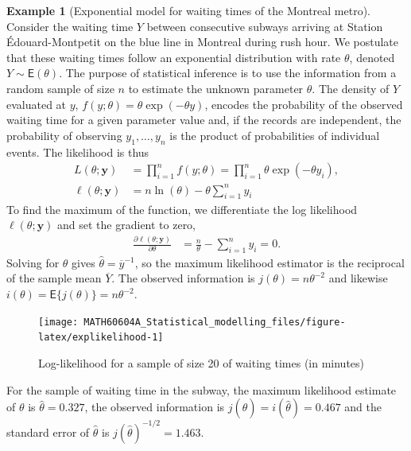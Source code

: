 \documentclass[
  11pt,
  letterpaper,
]{book}
\theoremstyle{definition}
\theoremstyle{definition}
\newtheorem{example}{Example}[chapter]
\theoremstyle{definition}
\theoremstyle{definition}
\theoremstyle{remark}
\begin{document}
\begin{example}[Exponential model for waiting times of the Montreal metro]
\protect\hypertarget{exm:waitingtime}{}\label{exm:waitingtime}Consider the waiting time \(Y\) between consecutive subways arriving at Station Édouard-Montpetit on the blue line in Montreal during rush hour. We postulate that these waiting times follow an exponential distribution with rate \(\theta\), denoted \(Y \sim \mathsf{E}(\theta)\). The purpose of statistical inference is to use the information from a random sample of size \(n\) to estimate the unknown parameter \(\theta\). The density of \(Y\) evaluated at \(y\), \(f(y; \theta)=\theta\exp(-\theta y)\), encodes the probability of the observed waiting time for a given parameter value and, if the records are independent, the probability of observing \(y_1, \ldots, y_n\) is the product of probabilities of individual events. The likelihood is thus
\begin{align*}
L(\theta; \boldsymbol{y}) &= \prod_{i=1}^n f(y; \theta)= \prod_{i=1}^n\theta\exp(-\theta y_i),\\
\ell(\theta; \boldsymbol{y}) & = n\ln(\theta) - \theta\sum_{i=1}^n y_i
\end{align*}
To find the maximum of the function, we differentiate the log likelihood \(\ell(\theta; \boldsymbol{y})\) and set the gradient to zero,
\begin{align*}
\frac{\partial \ell(\theta; \boldsymbol{y})}{\partial \theta} & = \frac{n}{\theta} - \sum_{i=1}^n y_i =0.
\end{align*}
Solving for \(\theta\) gives \(\widehat{\theta} = \overline{y}^{-1}\), so the maximum likelihood estimator is the reciprocal of the sample mean \(\overline{Y}\). The observed information is \(j(\theta) = n\theta^{-2}\) and likewise \(i(\theta)=\mathsf{E}\{j(\theta)\}=n\theta^{-2}\).
\end{example}

\begin{figure}

{\centering \texttt{[image: MATH60604A\_Statistical\_modelling\_files/figure-latex/explikelihood-1]} 

}

\caption{Log-likelihood for a sample of size 20 of waiting times (in minutes)}\label{fig:explikelihood}
\end{figure}

For the sample of waiting time in the subway, the maximum likelihood estimate of \(\theta\) is \(\widehat{\theta}=0.327\), the observed information is \(j(\widehat{\theta})=i(\widehat{\theta})=0.467\) and the standard error of \(\widehat{\theta}\) is \(j(\widehat{\theta})^{-1/2}=1.463\).
\end{document}
